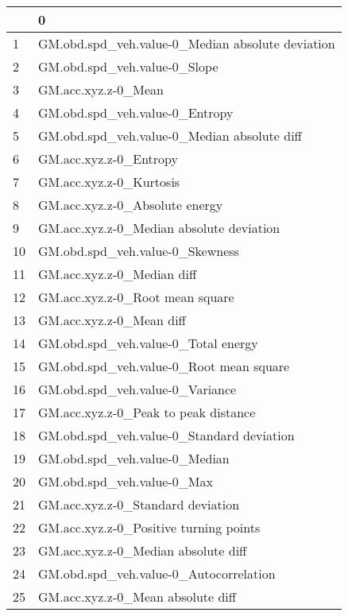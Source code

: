 \begin{tabular}{ll}
\toprule
{} &                                                 0 \\
\midrule
1  &  GM.obd.spd\_veh.value-0\_Median absolute deviation \\
2  &                      GM.obd.spd\_veh.value-0\_Slope \\
3  &                               GM.acc.xyz.z-0\_Mean \\
4  &                    GM.obd.spd\_veh.value-0\_Entropy \\
5  &       GM.obd.spd\_veh.value-0\_Median absolute diff \\
6  &                            GM.acc.xyz.z-0\_Entropy \\
7  &                           GM.acc.xyz.z-0\_Kurtosis \\
8  &                    GM.acc.xyz.z-0\_Absolute energy \\
9  &          GM.acc.xyz.z-0\_Median absolute deviation \\
10 &                   GM.obd.spd\_veh.value-0\_Skewness \\
11 &                        GM.acc.xyz.z-0\_Median diff \\
12 &                   GM.acc.xyz.z-0\_Root mean square \\
13 &                          GM.acc.xyz.z-0\_Mean diff \\
14 &               GM.obd.spd\_veh.value-0\_Total energy \\
15 &           GM.obd.spd\_veh.value-0\_Root mean square \\
16 &                   GM.obd.spd\_veh.value-0\_Variance \\
17 &              GM.acc.xyz.z-0\_Peak to peak distance \\
18 &         GM.obd.spd\_veh.value-0\_Standard deviation \\
19 &                     GM.obd.spd\_veh.value-0\_Median \\
20 &                        GM.obd.spd\_veh.value-0\_Max \\
21 &                 GM.acc.xyz.z-0\_Standard deviation \\
22 &            GM.acc.xyz.z-0\_Positive turning points \\
23 &               GM.acc.xyz.z-0\_Median absolute diff \\
24 &            GM.obd.spd\_veh.value-0\_Autocorrelation \\
25 &                 GM.acc.xyz.z-0\_Mean absolute diff \\

\end{tabular}
